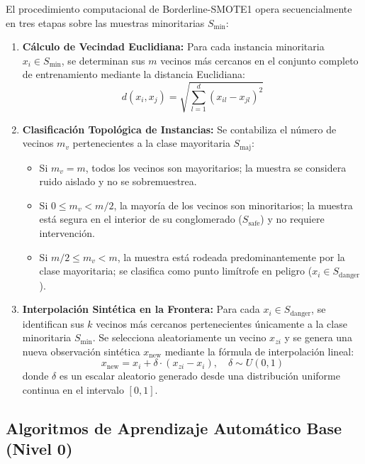 El procedimiento computacional de Borderline-SMOTE1 opera secuencialmente en tres etapas sobre las muestras minoritarias $S_{\mathrm{min}}$:
\begin{enumerate}
    \item \textbf{Cálculo de Vecindad Euclidiana:} Para cada instancia minoritaria $x_i \in S_{\mathrm{min}}$, se determinan sus $m$ vecinos más cercanos en el conjunto completo de entrenamiento mediante la distancia Euclidiana:
    \begin{equation}
    d(x_i, x_j) = \sqrt{\sum_{l=1}^d (x_{il} - x_{jl})^2}
    \end{equation}
    \item \textbf{Clasificación Topológica de Instancias:} Se contabiliza el número de vecinos $m_v$ pertenecientes a la clase mayoritaria $S_{\mathrm{maj}}$:
    \begin{itemize}
        \item Si $m_v = m$, todos los vecinos son mayoritarios; la muestra se considera ruido aislado y no se sobremuestrea.
        \item Si $0 \le m_v < m/2$, la mayoría de los vecinos son minoritarios; la muestra está segura en el interior de su conglomerado ($S_{\mathrm{safe}}$) y no requiere intervención.
        \item Si $m/2 \le m_v < m$, la muestra está rodeada predominantemente por la clase mayoritaria; se clasifica como punto limítrofe en peligro ($x_i \in S_{\mathrm{danger}}$).
    \end{itemize}
    \item \textbf{Interpolación Sintética en la Frontera:} Para cada $x_i \in S_{\mathrm{danger}}$, se identifican sus $k$ vecinos más cercanos pertenecientes únicamente a la clase minoritaria $S_{\mathrm{min}}$. Se selecciona aleatoriamente un vecino $x_{zi}$ y se genera una nueva observación sintética $x_{\mathrm{new}}$ mediante la fórmula de interpolación lineal:
    \begin{equation}
    x_{\mathrm{new}} = x_i + \delta \cdot (x_{zi} - x_i), \quad \delta \sim U(0,1)
    \end{equation}
    donde $\delta$ es un escalar aleatorio generado desde una distribución uniforme continua en el intervalo $[0, 1]$.
\end{enumerate}

\subsection{Algoritmos de Aprendizaje Automático Base (Nivel 0)}

